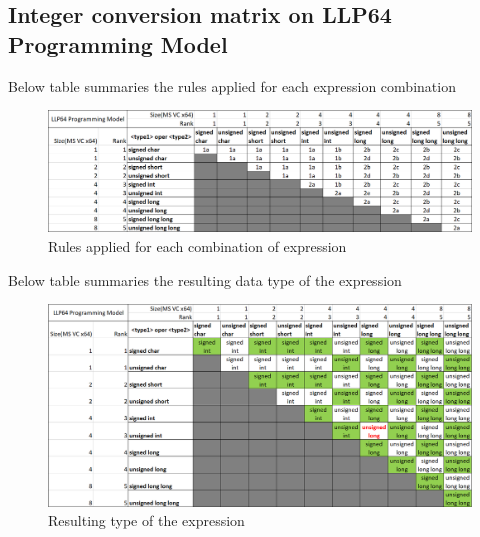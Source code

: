 \documentclass{article}
\begin{document}
\subsection{Integer conversion matrix on LLP64 Programming Model}
Below table summaries the rules applied for each expression combination
\begin{figure}[H]
\centering
\includegraphics[width=\textwidth]{Integer-Arithmetic-All-Datatypes.png}
\caption{Rules applied for each combination of expression}
\end{figure}

Below table summaries the resulting data type of the expression
\begin{figure}[H]
\centering
\includegraphics[width=\textwidth]{Resulting-Datatypes.png}
\caption{Resulting type of the expression}
\end{figure}
\end{document}
